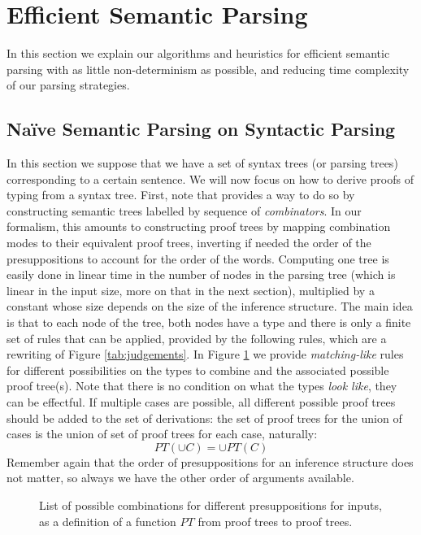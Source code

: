 \section{Efficient Semantic Parsing}
\label{sec:parsing}
In this section we explain our algorithms and heuristics for efficient semantic
parsing with as little non-determinism as possible, and reducing time complexity
of our parsing strategies.

\subsection{Naïve Semantic Parsing on Syntactic Parsing}
In this section we suppose that we have a set of syntax trees (or parsing trees) corresponding to a certain
sentence.
We will now focus on how to derive proofs of typing from a syntax tree.
First, note that \cite{bumfordEffectdrivenInterpretationFunctors2025} provides a way to do so by constructing
semantic trees labelled by sequence of \emph{combinators}.
In our formalism, this amounts to constructing proof trees by mapping combination modes to their equivalent proof
trees, inverting if needed the order of the presuppositions to account for the order of the words.
Computing one tree is easily done in linear time in the number of nodes in the parsing tree (which is linear in the input size,
more on that in the next section), multiplied by a constant whose size depends on the size of the inference
structure.
The main idea is that to each node of the tree, both nodes have a type and there is only a finite set of rules
that can be applied, provided by the following rules, which are a rewriting of Figure \ref{tab:judgements}.
In Figure \ref{tab:proof-trees} we provide \emph{matching-like} rules for different possibilities on the types to
combine and the associated possible proof tree(s).
Note that there is no condition on what the types \emph{look like}, they can be effectful.
If multiple cases are possible, all different possible proof trees should be added to the set of derivations: the
set of proof trees for the union of cases is the union of set of proof trees for each case, naturally:
\begin{equation*}
	PT\left( \cup C \right) = \cup PT(C)
\end{equation*}
Remember again that the order of presuppositions for an inference structure does not matter, so always we have the
other order of arguments available.

\begin{figure}
	\centering
	\caption{List of possible combinations for different presuppositions for inputs, as a definition of a function
		$PT$ from proof trees to proof trees.}
	\label{tab:proof-trees}
\end{figure}

